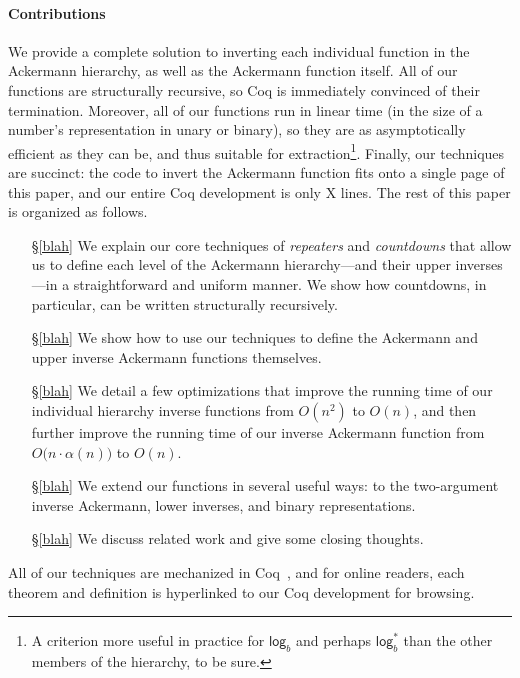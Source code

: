 \paragraph{Contributions}
We provide a complete solution to inverting each individual function in the Ackermann hierarchy,
as well as the Ackermann function itself.  All of our functions are structurally recursive, so
Coq is immediately convinced of their termination.  Moreover, all of our functions run in linear
time (in the size of a number's representation in unary or binary), so they are as asymptotically efficient as they can be, and thus suitable for extraction\footnote{A criterion more useful in practice for $\mathsf{log}_b$ and perhaps $\mathsf{log}^*_b$ than the other members of the hierarchy, to be sure.}.  Finally, our techniques are succinct: the code to invert the Ackermann function fits onto a single page of this paper, and our entire Coq development is only {\color{red} X} lines. The rest of this paper is organized as follows.
\begin{itemize}
\item[\S\ref{blah}] We explain our core techniques of \emph{repeaters} and \emph{countdowns} that allow us to define each level of the Ackermann hierarchy---and their upper inverses---in a straightforward and uniform manner.  We show how countdowns, in particular, can be written
    structurally recursively.
\item[\S\ref{blah}] We show how to use our techniques to define the Ackermann and upper inverse Ackermann functions themselves.
\item[\S\ref{blah}] We detail a few optimizations that improve the running time of our individual hierarchy inverse functions from $O(n^2)$ to $O(n)$, and then further improve the running time of our inverse Ackermann function from $O\big(n \cdot \alpha(n)\big)$ to $O(n)$.
\item[\S\ref{blah}] We extend our functions in several useful ways: to the two-argument inverse Ackermann, lower inverses, and binary representations.
\item[\S\ref{blah}] We discuss related work and give some closing thoughts.
\end{itemize}
All of our techniques are mechanized in Coq~\cite{blah}, and for online readers, 
each theorem and definition is hyperlinked to our Coq development for browsing.

